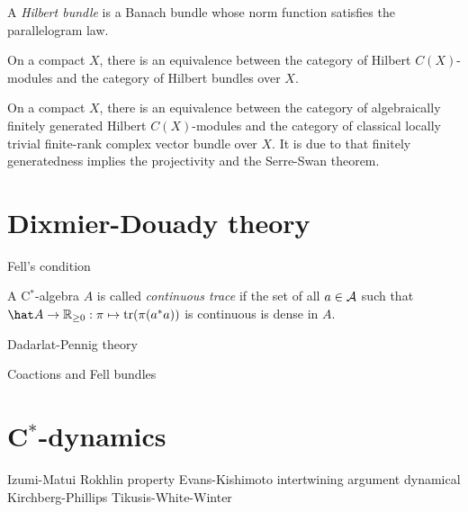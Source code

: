 \documentclass{../../large}
\begin{document}
\begin{prb}
A \emph{Hilbert bundle} is a Banach bundle whose norm function satisfies the parallelogram law.

\begin{parts}
\item On a compact $X$, there is an equivalence between the category of Hilbert $C(X)$-modules and the category of Hilbert bundles over $X$.
\item On a compact $X$, there is an equivalence between the category of algebraically finitely generated Hilbert $C(X)$-modules and the category of classical locally trivial finite-rank complex vector bundle over $X$.
It is due to that finitely generatedness implies the projectivity and the Serre-Swan theorem.
\end{parts}
\end{prb}



\section{Dixmier-Douady theory}


Fell's condition

A C$^*$-algebra $A$ is called \emph{continuous trace} if the set of all $a\in\mathcal{A}$ such that $\hat A\to\R_{\ge0}:\pi\mapsto\tr(\pi(a^*a))$ is continuous is dense in $A$.



Dadarlat-Pennig theory


Coactions and Fell bundles



\section{C$^*$-dynamics}

Izumi-Matui
Rokhlin property
Evans-Kishimoto intertwining argument
dynamical Kirchberg-Phillips
Tikusis-White-Winter
\end{document}
